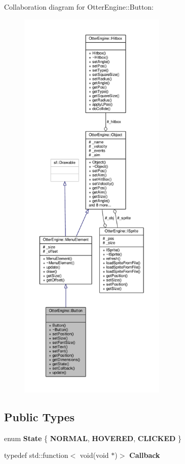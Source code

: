 Collaboration diagram for Otter\+Engine\+:\+:Button\+:\nopagebreak
\begin{figure}[H]
\begin{center}
\leavevmode
\includegraphics[height=550pt]{d0/d82/class_otter_engine_1_1_button__coll__graph}
\end{center}
\end{figure}
\subsection*{Public Types}
\begin{DoxyCompactItemize}
\item 
enum {\bfseries State} \{ {\bfseries N\+O\+R\+M\+AL}, 
{\bfseries H\+O\+V\+E\+R\+ED}, 
{\bfseries C\+L\+I\+C\+K\+ED}
 \}\hypertarget{class_otter_engine_1_1_button_ac1f3343e32d3da7b37720e503035152c}{}\label{class_otter_engine_1_1_button_ac1f3343e32d3da7b37720e503035152c}

\item 
typedef std\+::function$<$ void(void $\ast$)$>$ {\bfseries Callback}\hypertarget{class_otter_engine_1_1_button_a9b2fd0dcdfd6bd46bf1802ee374bf719}{}\label{class_otter_engine_1_1_button_a9b2fd0dcdfd6bd46bf1802ee374bf719}

\end{DoxyCompactItemize}
